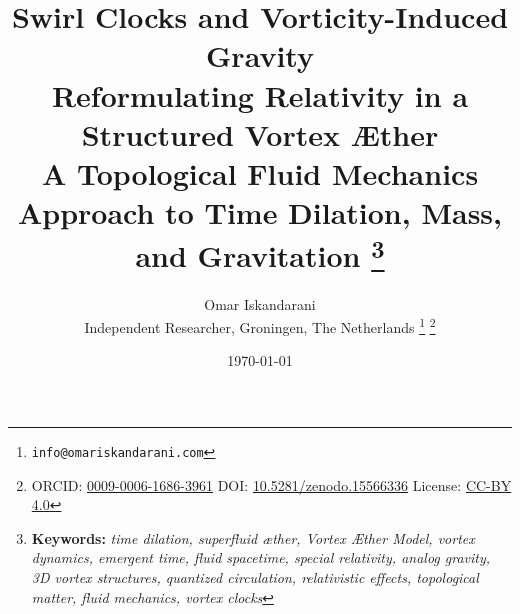 \documentclass[a4paper,12pt]{article} %
\begin{document}
\title{
  \textbf{Swirl Clocks and Vorticity-Induced Gravity}\\[0.5em]
  \large Reformulating Relativity in a Structured Vortex Æther\\
  \normalsize A Topological Fluid Mechanics Approach to Time Dilation, Mass, and Gravitation
\noindent\thanks{\textbf{Keywords:} \textit{time dilation, superfluid æther, Vortex Æther Model, vortex dynamics, emergent time, fluid spacetime, special relativity, analog gravity, 3D vortex structures, quantized circulation, relativistic effects, topological matter, fluid mechanics, vortex clocks}}
}

\author{
  Omar Iskandarani\\
  \small Independent Researcher, Groningen, The Netherlands
  \thanks{\texttt{info@omariskandarani.com}}
  \thanks{ORCID: \href{https://orcid.org/0009-0006-1686-3961}{0009-0006-1686-3961} \quad DOI: \href{https://doi.org/10.5281/zenodo.15566336}{10.5281/zenodo.15566336} \quad License: \href{https://creativecommons.org/licenses/by/4.0/}{CC-BY 4.0}}
}

\date{\today}
\maketitle
\end{document}
